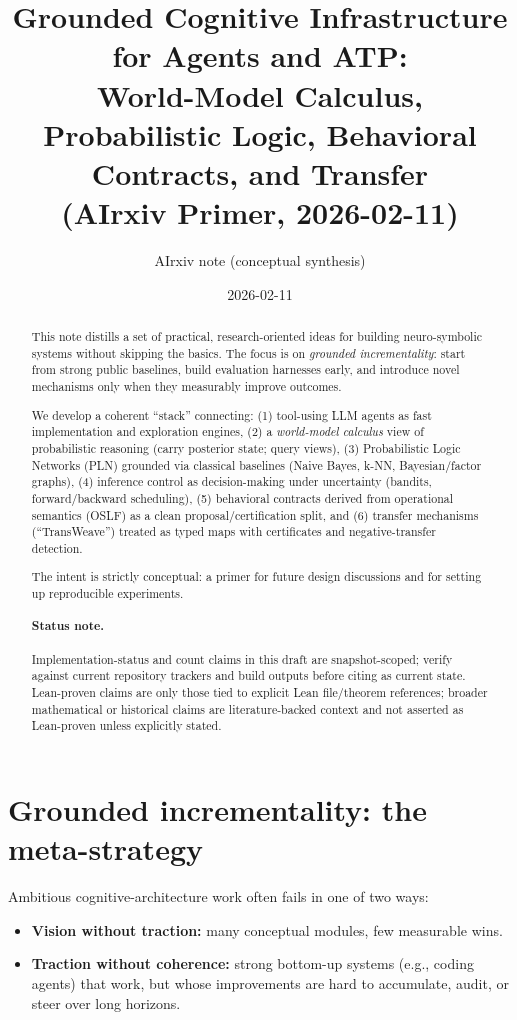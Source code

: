 \documentclass[11pt]{article}
\title{Grounded Cognitive Infrastructure for Agents and ATP:\\
World-Model Calculus, Probabilistic Logic, Behavioral Contracts, and Transfer\\
(AIrxiv Primer, 2026-02-11)}
\author{AIrxiv note (conceptual synthesis)}
\date{2026-02-11}
\begin{document}
\maketitle

\begin{abstract}
This note distills a set of practical, research-oriented ideas for building neuro-symbolic systems
without skipping the basics.
The focus is on \emph{grounded incrementality}: start from strong public baselines, build evaluation
harnesses early, and introduce novel mechanisms only when they measurably improve outcomes.

We develop a coherent ``stack'' connecting:
(1) tool-using LLM agents as fast implementation and exploration engines,
(2) a \emph{world-model calculus} view of probabilistic reasoning (carry posterior state; query views),
(3) Probabilistic Logic Networks (PLN) grounded via classical baselines (Naive Bayes, k-NN, Bayesian/factor graphs),
(4) inference control as decision-making under uncertainty (bandits, forward/backward scheduling),
(5) behavioral contracts derived from operational semantics (OSLF) as a clean proposal/certification split,
and (6) transfer mechanisms (``TransWeave'') treated as typed maps with certificates and negative-transfer detection.

The intent is strictly conceptual: a primer for future design discussions and for setting up reproducible experiments.
\paragraph{Status note.} Implementation-status and count claims in this draft are snapshot-scoped; verify against current repository trackers and build outputs before citing as current state. Lean-proven claims are only those tied to explicit Lean file/theorem references; broader mathematical or historical claims are literature-backed context and not asserted as Lean-proven unless explicitly stated.
\end{abstract}

\tableofcontents

\section{Grounded incrementality: the meta-strategy}

Ambitious cognitive-architecture work often fails in one of two ways:
\begin{itemize}[leftmargin=2em]
\item \textbf{Vision without traction:} many conceptual modules, few measurable wins.
\item \textbf{Traction without coherence:} strong bottom-up systems (e.g., coding agents) that work,
but whose improvements are hard to accumulate, audit, or steer over long horizons.
\end{itemize}
\end{document}
